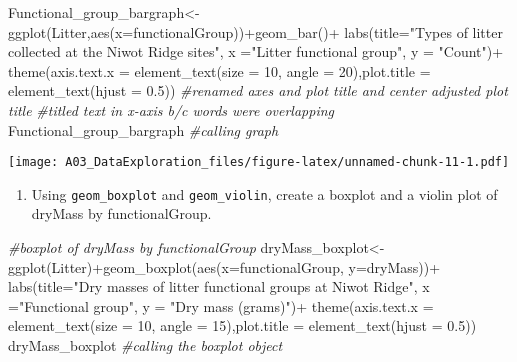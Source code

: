 \documentclass[
]{article}
\newenvironment{Shaded}{\begin{snugshade}}{\end{snugshade}}
\newcommand{\AttributeTok}[1]{\textcolor[rgb]{0.77,0.63,0.00}{#1}}
\newcommand{\CommentTok}[1]{\textcolor[rgb]{0.56,0.35,0.01}{\textit{#1}}}
\newcommand{\DecValTok}[1]{\textcolor[rgb]{0.00,0.00,0.81}{#1}}
\newcommand{\FloatTok}[1]{\textcolor[rgb]{0.00,0.00,0.81}{#1}}
\newcommand{\FunctionTok}[1]{\textcolor[rgb]{0.00,0.00,0.00}{#1}}
\newcommand{\NormalTok}[1]{#1}
\newcommand{\OtherTok}[1]{\textcolor[rgb]{0.56,0.35,0.01}{#1}}
\newcommand{\SpecialCharTok}[1]{\textcolor[rgb]{0.00,0.00,0.00}{#1}}
\newcommand{\StringTok}[1]{\textcolor[rgb]{0.31,0.60,0.02}{#1}}
\providecommand{\tightlist}{%
  \setlength{\itemsep}{0pt}\setlength{\parskip}{0pt}}
\begin{document}
\begin{Shaded}
\begin{Highlighting}[]
\NormalTok{Functional\_group\_bargraph}\OtherTok{\textless{}{-}}\FunctionTok{ggplot}\NormalTok{(Litter,}\FunctionTok{aes}\NormalTok{(}\AttributeTok{x=}\NormalTok{functionalGroup))}\SpecialCharTok{+}\FunctionTok{geom\_bar}\NormalTok{()}\SpecialCharTok{+}
  \FunctionTok{labs}\NormalTok{(}\AttributeTok{title=}\StringTok{"Types of litter collected at the Niwot Ridge sites"}\NormalTok{,}
  \AttributeTok{x =}\StringTok{"Litter functional group"}\NormalTok{, }\AttributeTok{y =} \StringTok{"Count"}\NormalTok{)}\SpecialCharTok{+}
  \FunctionTok{theme}\NormalTok{(}\AttributeTok{axis.text.x =} \FunctionTok{element\_text}\NormalTok{(}\AttributeTok{size =} \DecValTok{10}\NormalTok{, }\AttributeTok{angle =} \DecValTok{20}\NormalTok{),}\AttributeTok{plot.title =} \FunctionTok{element\_text}\NormalTok{(}\AttributeTok{hjust =} \FloatTok{0.5}\NormalTok{)) }
\CommentTok{\#renamed axes and plot title and center adjusted plot title}
\CommentTok{\#titled text in x{-}axis b/c words were overlapping}
\NormalTok{Functional\_group\_bargraph }\CommentTok{\#calling graph }
\end{Highlighting}
\end{Shaded}

\texttt{[image: A03\_DataExploration\_files/figure-latex/unnamed-chunk-11-1.pdf]}

\begin{enumerate}
\def\labelenumi{\arabic{enumi}.}
\setcounter{enumi}{14}
\tightlist
\item
  Using \texttt{geom\_boxplot} and \texttt{geom\_violin}, create a
  boxplot and a violin plot of dryMass by functionalGroup.
\end{enumerate}

\begin{Shaded}
\begin{Highlighting}[]
\CommentTok{\#boxplot of dryMass by functionalGroup}
\NormalTok{dryMass\_boxplot}\OtherTok{\textless{}{-}}\FunctionTok{ggplot}\NormalTok{(Litter)}\SpecialCharTok{+}\FunctionTok{geom\_boxplot}\NormalTok{(}\FunctionTok{aes}\NormalTok{(}\AttributeTok{x=}\NormalTok{functionalGroup, }\AttributeTok{y=}\NormalTok{dryMass))}\SpecialCharTok{+}
  \FunctionTok{labs}\NormalTok{(}\AttributeTok{title=}\StringTok{"Dry masses of litter functional groups at Niwot Ridge"}\NormalTok{,}
  \AttributeTok{x =}\StringTok{"Functional group"}\NormalTok{, }\AttributeTok{y =} \StringTok{"Dry mass (grams)"}\NormalTok{)}\SpecialCharTok{+}
  \FunctionTok{theme}\NormalTok{(}\AttributeTok{axis.text.x =} \FunctionTok{element\_text}\NormalTok{(}\AttributeTok{size =} \DecValTok{10}\NormalTok{, }\AttributeTok{angle =} \DecValTok{15}\NormalTok{),}\AttributeTok{plot.title =} \FunctionTok{element\_text}\NormalTok{(}\AttributeTok{hjust =} \FloatTok{0.5}\NormalTok{)) }
\NormalTok{dryMass\_boxplot }\CommentTok{\#calling the boxplot object}
\end{Highlighting}
\end{Shaded}
\end{document}
